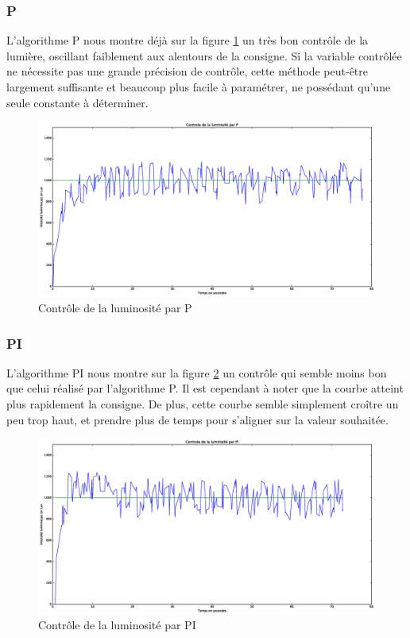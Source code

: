 \documentclass[a4paper,10pt]{report}
\begin{document}
\subsubsection{P}
L'algorithme P nous montre déjà sur la figure \ref{fig:p} un très bon contrôle de la lumière, oscillant faiblement aux alentours de la consigne.
Si la variable contrôlée ne nécessite pas une grande précision de contrôle, cette méthode peut-être largement suffisante et beaucoup plus facile à paramétrer, ne possédant qu'une seule constante à déterminer.
\begin{figure}[hb!]
   \centering
   \includegraphics[scale=0.35]{P.eps}
   \caption{\label{fig:p} Contrôle de la luminosité par P}
\end{figure}

\subsubsection{PI}
L'algorithme PI nous montre sur la figure \ref{fig:pi} un contrôle qui semble moins bon que celui réalisé par l'algorithme P. Il est cependant à noter que la courbe atteint plus rapidement la consigne. De plus, cette courbe semble simplement croître un peu trop haut, et prendre plus de temps pour s'aligner sur la valeur souhaitée.
\begin{figure}[hb!]
   \centering
   \includegraphics[scale=0.35]{PI.eps}
   \caption{\label{fig:pi} Contrôle de la luminosité par PI}
\end{figure}
\end{document}
